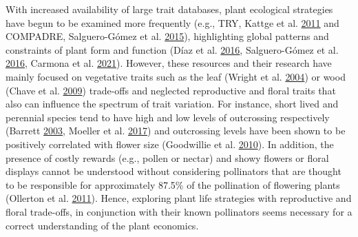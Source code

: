 \documentclass[11pt,a4paper,]{article}
\begin{document}
With increased availability of large trait databases, plant ecological
strategies have begun to be examined more frequently (e.g., TRY, Kattge
et al. \protect\hyperlink{ref-kattge2011}{2011} and COMPADRE,
Salguero-Gómez et al. \protect\hyperlink{ref-salguero2015}{2015}),
highlighting global patterns and constraints of plant form and function
(Díaz et al. \protect\hyperlink{ref-diaz2016}{2016}, Salguero-Gómez et
al. \protect\hyperlink{ref-salguero2016}{2016}, Carmona et al.
\protect\hyperlink{ref-carmona2021}{2021}). However, these resources and
their research have mainly focused on vegetative traits such as the leaf
(Wright et al. \protect\hyperlink{ref-wright2004}{2004}) or wood (Chave
et al. \protect\hyperlink{ref-chave2009}{2009}) trade-offs and neglected
reproductive and floral traits that also can influence the spectrum of
trait variation. For instance, short lived and perennial species tend to
have high and low levels of outcrossing respectively (Barrett
\protect\hyperlink{ref-barrett2003}{2003}, Moeller et al.
\protect\hyperlink{ref-moeller2017}{2017}) and outcrossing levels have
been shown to be positively correlated with flower size (Goodwillie et
al. \protect\hyperlink{ref-goodwillie2010}{2010}). In addition, the
presence of costly rewards (e.g., pollen or nectar) and showy flowers or
floral displays cannot be understood without considering pollinators
that are thought to be responsible for approximately 87.5\% of the
pollination of flowering plants (Ollerton et al.
\protect\hyperlink{ref-ollerton2011}{2011}). Hence, exploring plant life
strategies with reproductive and floral trade-offs, in conjunction with
their known pollinators seems necessary for a correct understanding of
the plant economics.
\end{document}
